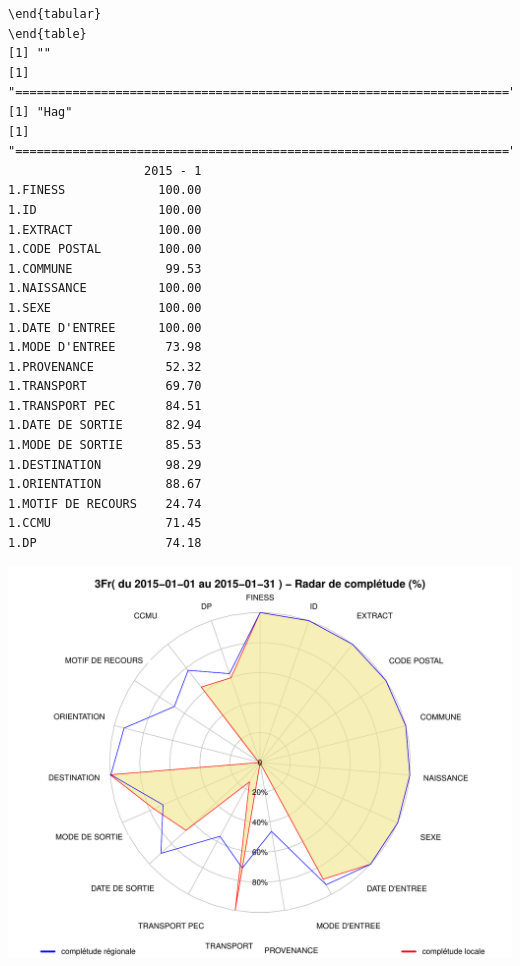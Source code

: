 \documentclass[]{article}
\begin{document}
\begin{verbatim}
\end{tabular} 
\end{table} 
[1] ""
[1] "====================================================================="
[1] "Hag"
[1] "====================================================================="
                   2015 - 1
1.FINESS             100.00
1.ID                 100.00
1.EXTRACT            100.00
1.CODE POSTAL        100.00
1.COMMUNE             99.53
1.NAISSANCE          100.00
1.SEXE               100.00
1.DATE D'ENTREE      100.00
1.MODE D'ENTREE       73.98
1.PROVENANCE          52.32
1.TRANSPORT           69.70
1.TRANSPORT PEC       84.51
1.DATE DE SORTIE      82.94
1.MODE DE SORTIE      85.53
1.DESTINATION         98.29
1.ORIENTATION         88.67
1.MOTIF DE RECOURS    24.74
1.CCMU                71.45
1.DP                  74.18
\end{verbatim}

\includegraphics{completude_files/figure-latex/finess-7.pdf}
\end{document}

